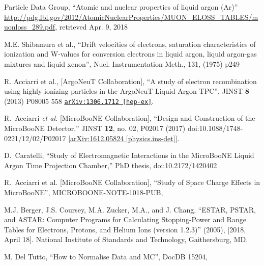 \begin{thebibliography}{99}
 Particle Data Group, ``Atomic and nuclear properties of liquid argon (Ar)'' \url{http://pdg.lbl.gov/2012/AtomicNuclearProperties/MUON_ELOSS_TABLES/muonloss_289.pdf}, retrieved Apr. 9, 2018

 M.E. Shibamura et al., ``Drift velocities of electrons, saturation characteristics of ionization and W-values for conversion electrons in liquid argon, liquid argon-gas mixtures and liquid xenon'', Nucl. Instrumentation Meth., 131, (1975) p249

 R. Acciarri et al., [ArgoNeuT Collaboration], ``A study of electron recombination using highly ionizing particles in the ArgoNeuT Liquid Argon TPC'', JINST {\bf 8} (2013) P08005
558 \href{https://arxiv.org/abs/1306.1712}{\texttt{arXiv:1306.1712 [hep-ex]}}.

  R.~Acciarri {\it et al.} [MicroBooNE Collaboration],
  ``Design and Construction of the MicroBooNE Detector,''
  JINST {\bf 12}, no. 02, P02017 (2017)
  doi:10.1088/1748-0221/12/02/P02017
  \href{https://arxiv.org/abs/1612.05824}{[arXiv:1612.05824 [physics.ins-det]]}.

  D.~Caratelli,
  ``Study of Electromagnetic Interactions in the MicroBooNE Liquid Argon Time Projection Chamber,'' PhD thesis,
  doi:10.2172/1420402
  
 R.~Acciarri et al. [MicroBooNE Collaboration], ``Study of Space Charge Effects in MicroBooNE'', MICROBOONE-NOTE-1018-PUB, \href{https://www-microboone.fnal.gov/publications/publicnotes/MICROBOONE-NOTE-1018-PUB.pdf}{}

 M.J. Berger, J.S. Coursey, M.A. Zucker, M.A., and J. Chang, ``ESTAR, PSTAR, and ASTAR: Computer Programs for Calculating Stopping-Power and Range Tables for Electrons, Protons, and Helium Ions (version 1.2.3)'' (2005), \href{http://physics.nist.gov/Star}{} [2018, April 18]. National Institute of Standards and Technology, Gaithersburg, MD.

 M. Del Tutto, ``How to Normalise Data and MC'', DocDB 15204, \href{https://microboone-docdb.fnal.gov/cgi-bin/private/ShowDocument?docid=15204}{} 

\end{thebibliography}